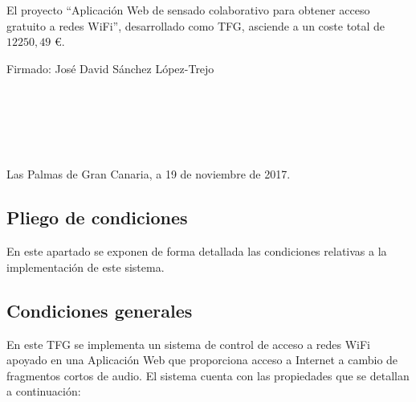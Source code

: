 El proyecto ``Aplicación Web de sensado colaborativo para obtener acceso gratuito a redes WiFi'', desarrollado como TFG, asciende a un coste total de $12250,49$ \euro.

\indent Firmado: José David Sánchez López-Trejo \\~ \\~ \\~ \\~ \\~
\begin{flushright}
Las Palmas de Gran Canaria, a 19 de noviembre de 2017.
\end{flushright}

\cleardoublepage
{}
\begin{center}
\begin{minipage}{.75\textwidth}
\section*{Pliego de condiciones}

En este apartado se exponen de forma detallada las condiciones relativas a la implementación de este sistema.
\end{minipage}
\end{center}
\clearpage
\subsection*{Condiciones generales}
En este TFG se implementa un sistema de control de acceso a redes WiFi apoyado en una Aplicación Web que proporciona acceso a Internet a cambio de fragmentos cortos de audio. El sistema cuenta con las propiedades que se detallan a continuación:

